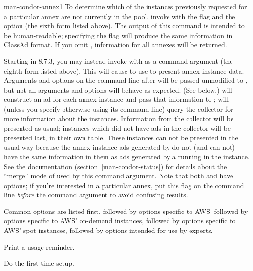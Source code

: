 \begin{ManPage}{}{man-condor-annex}{1}
To determine which of the instances previously requested for a
particular annex are not currently in the pool, invoke 
with the  flag and the  option (the sixth
form listed above).  The output of this command is intended to be
human-readable; specifying the  flag will produce the
same information in ClassAd format.  If you omit ,
information for all annexes will be returned.

Starting in 8.7.3, you may instead invoke  with 
as a command argument (the eighth form listed above).  This will cause  to use 
to present annex instance data.  Arguments and options on the command line
after  will be passed unmodified to , but not
all arguments and options will behave as expected.  (See below.)
 will construct an ad for each annex instance and pass that
information to ;  will (unless you specify
otherwise using its command line) query the collector for more information
about the instances.  Information from the collector will be presented as
usual; instances which did not have ads in the collector will be presented
last, in their own table.  These instances can not be presented in the
usual way because the annex instance ads generated by  do not
(and can not) have the same information in them as ads generated by a
 running in the instance.  See the 
documentation (section~\ref{man-condor-status}) for details about the ``merge'' mode of
 used by this command argument.  Note that both 
and  have  options; if you're interested
in a particular annex, put this flag on the command line \emph{before}
the  command argument to avoid confusing results.

Common options are listed first, followed by options specific to AWS,
followed by options specific to AWS' on-demand instances, followed by
options specific to AWS' spot instances, followed by options intended
for use by experts.

\begin{Options}
		{Print a usage reminder.}

		{Do the first-time setup.}


\end{Options}
\end{ManPage}
